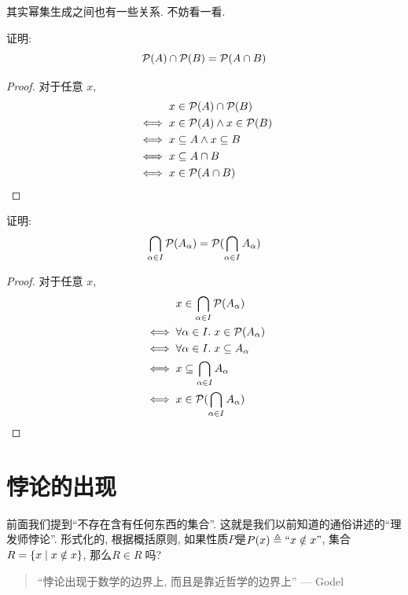 其实幂集生成之间也有一些关系. 不妨看一看. 

\begin{theorem}
  证明: 
  \[
      \mathcal{P}(A) \cap \mathcal{P}(B) = \mathcal{P}(A \cap B)
  \]
\end{theorem}

\begin{proof}
  对于任意 $x$,
  \begin{align*}
    &\textcolor{white}{\iff}\;\; x \in \ps{A} \cap \ps{B} \\
    &\iff x \in \ps{A} \land x \in \ps{B} \\
    &\iff x \subseteq A \land x \subseteq B \\
    &\iff x \subseteq A \cap B \\
    &\iff x \in \ps{A \cap B}
  \end{align*}
\end{proof}

\begin{theorem}
  证明: 
  \[
    \bigcap_{\alpha \in I} \mathcal{P}(A_{\alpha}) = \mathcal{P}(\bigcap_{\alpha \in I} A_{\alpha})
  \]
\end{theorem}

\begin{proof}
  对于任意 $x$,
  \begin{align*}
    &\textcolor{white}{\iff}\;\; x \in \bigcap_{\alpha \in I} \ps{A_{\alpha}} \\
    &\iff \forall \alpha \in I.\; x \in \ps{A_{\alpha}} \\
    &\iff \forall \alpha \in I.\; x \subseteq A_{\alpha} \\
    &\iff x \subseteq \bigcap_{\alpha \in I} A_{\alpha} \\
    &\iff x \in \ps{\bigcap_{\alpha \in I} A_{\alpha}}
  \end{align*}
\end{proof}

\section{悖论的出现}

前面我们提到``不存在含有任何东西的集合''. 这就是我们以前知道的通俗讲述的``理发师悖论''. 形式化的, 根据概括原则, 如果性质$P$是$P(x) \triangleq ``x \notin x"$, 集合$R = \{x \mid x \notin x\}$, 那么$R \in R\;$吗? 

\begin{quote}
  ``悖论出现于数学的边界上, 而且是靠近哲学的边界上''
  \hfill --- Godel
\end{quote}

